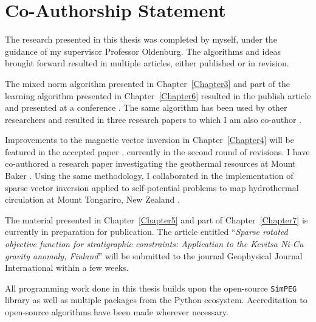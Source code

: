 
\chapter{Co-Authorship Statement}
The research presented in this thesis was completed by myself, under the guidance of my supervisor Professor Oldenburg.
The algorithms and ideas brought forward resulted in multiple articles, either published or in revision. 
  
The mixed norm algorithm presented in Chapter~\ref{Chapter3} and part of the learning algorithm presented in Chapter~\ref{Chapter6} resulted in the publish article \cite{FournierDWO2019} and presented at a conference \cite[]{FournierDavis2016a}.
The same algorithm has been used by other researchers and resulted in three research papers to which I am also co-author \cite[]{Miller2017, Abedi2018, Abedi2018a}.

Improvements to the magnetic vector inversion in Chapter~\ref{Chapter4} will be featured in the accepted paper \cite{Fournier2019b}, currently in the second round of revisions. I have co-authored a research paper investigating the geothermal resources at Mount Baker \cite[]{Schermerhorn2017}.
Using the same methodology, I collaborated in the implementation of sparse vector inversion applied to self-potential problems to map hydrothermal circulation at Mount Tongariro, New Zealand \cite[]{Miller2018}. 

The material presented in Chapter~\ref{Chapter5} and part of Chapter~\ref{Chapter7} is currently in preparation for publication. The article entitled ``\emph{Sparse rotated objective function for stratigraphic constraints: Application to the Kevitsa Ni-Cu gravity anomaly, Finland}'' will be submitted to the journal Geophysical Journal International within a few weeks.

All programming work done in this thesis builds upon the open-source \texttt{SimPEG} library as well as multiple packages from the Python ecosystem. Accreditation to open-source algorithms have been made wherever necessary.